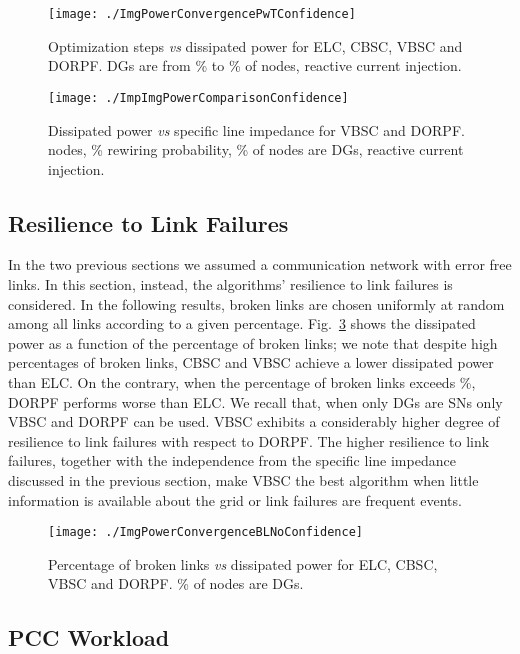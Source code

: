 \documentclass[journal]{IEEEtran}
\newcommand{\fig}[1]{Fig.~\ref{#1}}
\begin{document}
\begin{figure}
\centering
\texttt{[image: ./ImgPowerConvergencePwTConfidence]}
\caption{Optimization steps {\it vs} dissipated power for ELC, CBSC, VBSC and DORPF. DGs are from \% to \% of nodes, reactive current injection.}\label{figure:PwT}
\end{figure}

\begin{figure}
\centering
\texttt{[image: ./ImpImgPowerComparisonConfidence]}
\caption{Dissipated power {\it vs} specific line impedance for VBSC and DORPF.  nodes, \% rewiring probability, \% of nodes are DGs, reactive current injection.\label{figure:IMPCMP}}
\end{figure}



\subsection{Resilience to Link Failures}
\label{ssec:algoResilience}

In the two previous sections we assumed a communication network with error free links. In this section, instead, the algorithms' resilience to link failures is considered. In the following results, broken links are chosen uniformly at random among all links according to a given percentage. \fig{figure:BL} shows the dissipated power as a function of the percentage of broken links; we note that despite high percentages of broken links, CBSC and VBSC achieve a lower dissipated power than ELC. On the contrary, when the percentage of broken links exceeds \%, DORPF performs worse than ELC. We recall that, when only DGs are SNs only VBSC and DORPF can be used. VBSC exhibits a considerably higher degree of resilience to link failures with respect to DORPF. The higher resilience to link failures, together with the independence from the specific line impedance discussed in the previous section, make VBSC the best algorithm when little information is available about the grid or link failures are frequent events. 

\begin{figure}
\centering
\texttt{[image: ./ImgPowerConvergenceBLNoConfidence]}
\caption{Percentage of broken links {\it vs} dissipated power for ELC, CBSC, VBSC and DORPF. \% of nodes are DGs.\label{figure:BL}}
\end{figure}

\subsection{PCC Workload}
\end{document}

